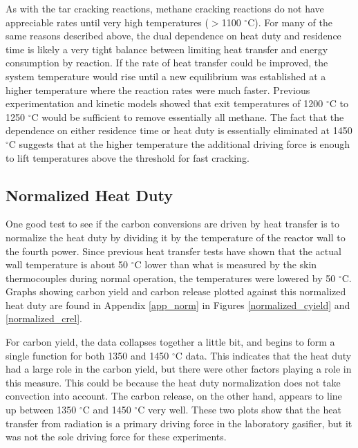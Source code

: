 \documentclass[11pt,twocolumn]{article}
\begin{document}
As with the tar cracking reactions, methane cracking reactions do not have appreciable rates until very high temperatures ($>$1100 $^{\circ}$C).  For many of the same reasons described above, the dual dependence on heat duty and residence time is likely a very tight balance between limiting heat transfer and energy consumption by reaction.  If the rate of heat transfer could be improved, the system temperature would rise until a new equilibrium was established at a higher temperature where the reaction rates were much faster.  Previous experimentation and kinetic models showed that exit temperatures of 1200 $^{\circ}$C to 1250 $^{\circ}$C would be sufficient to remove essentially all methane.  The fact that the dependence on either residence time or heat duty is essentially eliminated at 1450 $^{\circ}$C suggests that at the higher temperature the additional driving force is enough to lift temperatures above the threshold for fast cracking.

\subsection*{Normalized Heat Duty}

One good test to see if the carbon conversions are driven by heat transfer is to normalize the heat duty by dividing it by the temperature of the reactor wall to the fourth power.  Since previous heat transfer tests have shown that the actual wall temperature is about 50 $^\circ$C lower than what is measured by the skin thermocouples during normal operation, the temperatures were lowered by 50 $^\circ$C.  Graphs showing carbon yield and carbon release plotted against this normalized heat duty are found in Appendix \ref{app_norm} in Figures \ref{normalized_cyield} and \ref{normalized_crel}.

For carbon yield, the data collapses together a little bit, and begins to form a single function for both 1350 and 1450 $^\circ$C data.  This indicates that the heat duty had a large role in the carbon yield, but there were other factors playing a role in this measure.  This could be because the heat duty normalization does not take convection into account.  The carbon release, on the other hand, appears to line up between 1350 $^\circ$C and 1450 $^\circ$C very well.  These two plots show that the heat transfer from radiation is a primary driving force in the laboratory gasifier, but it was not the sole driving force for these experiments.

\end{document}
